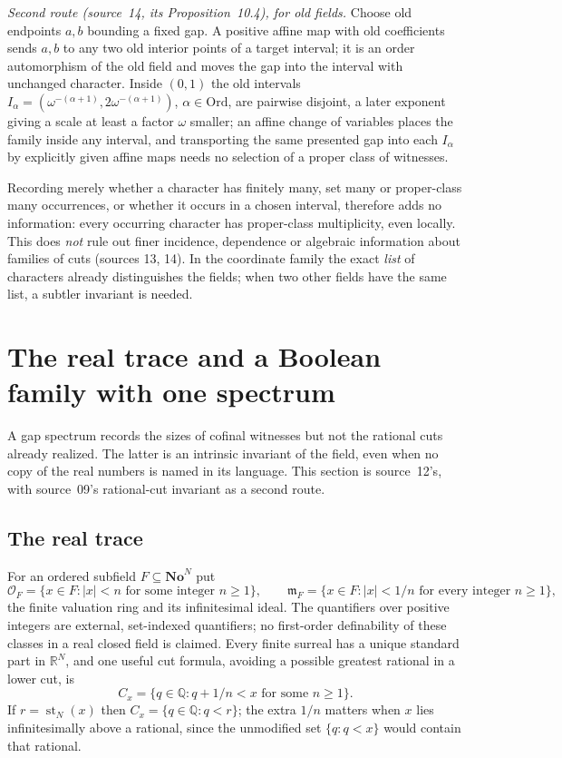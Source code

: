 \documentclass[11pt,letterpaper]{article}
\numberwithin{equation}{section}
\theoremstyle{definition}
\theoremstyle{remark}
\newcommand{\No}{\mathbf{No}}
\newcommand{\NoN}{\No^{N}}
\newcommand{\Ord}{\mathrm{Ord}}
\newcommand{\R}{\mathbb R}
\newcommand{\Q}{\mathbb Q}
\newcommand{\abs}[1]{\lvert#1\rvert}
\newcommand{\st}{\operatorname{st}}
\begin{document}
\emph{Second route (source~14, its Proposition~10.4), for old fields.} Choose old endpoints
$a,b$ bounding a fixed gap. A positive affine map with old coefficients sends $a,b$ to any two
old interior points of a target interval; it is an order automorphism of the old field and
moves the gap into the interval with unchanged character. Inside $(0,1)$ the old intervals
$I_\alpha=(\omega^{-(\alpha+1)},2\omega^{-(\alpha+1)})$, $\alpha\in\Ord$, are pairwise disjoint,
a later exponent giving a scale at least a factor $\omega$ smaller; an affine change of
variables places the family inside any interval, and transporting the same presented gap into
each $I_\alpha$ by explicitly given affine maps needs no selection of a proper class of
witnesses.

Recording merely whether a character has finitely many, set many or proper-class many
occurrences, or whether it occurs in a chosen interval, therefore adds no information: every
occurring character has proper-class multiplicity, even locally. This does \emph{not} rule
out finer incidence, dependence or algebraic information about families of cuts (sources 13,
14). In the coordinate family the exact \emph{list} of characters already distinguishes the
fields; when two other fields have the same list, a subtler invariant is needed.

\section{The real trace and a Boolean family with one spectrum}\label{univ:gs:sec:trace}

A gap spectrum records the sizes of cofinal witnesses but not the rational cuts already
realized. The latter is an intrinsic invariant of the field, even when no copy of the real
numbers is named in its language. This section is source~12's, with source~09's
rational-cut invariant as a second route.

\subsection{The real trace}

For an ordered subfield $F\subseteq\NoN$ put
\[
 \mathcal O_F=\{x\in F:\abs x<n\text{ for some integer }n\ge1\},\qquad
 \mathfrak m_F=\{x\in F:\abs x<1/n\text{ for every integer }n\ge1\},
\]
the finite valuation ring and its infinitesimal ideal. The quantifiers over positive
integers are external, set-indexed quantifiers; no first-order definability of these classes
in a real closed field is claimed. Every finite surreal has a unique standard part in
$\R^N$, and one useful cut formula, avoiding a possible greatest rational in a lower cut, is
\[
 C_x=\{q\in\Q:q+1/n<x\text{ for some }n\ge1\}.
\]
If $r=\st_N(x)$ then $C_x=\{q\in\Q:q<r\}$; the extra $1/n$ matters when $x$ lies
infinitesimally above a rational, since the unmodified set $\{q:q<x\}$ would contain that
rational.
\end{document}
